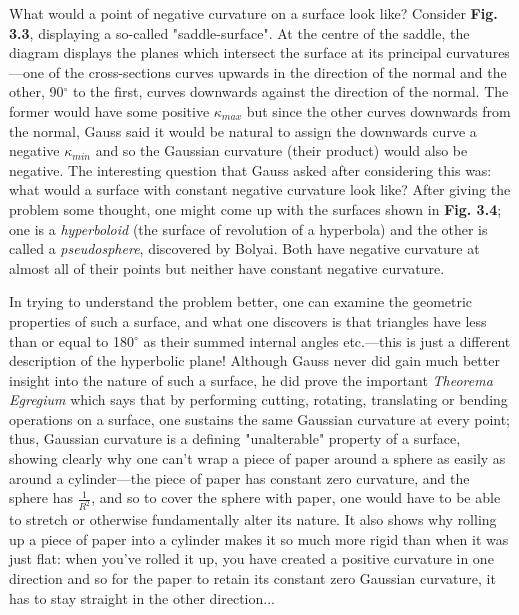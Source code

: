 \begin{multicols}{2}

What would a point of negative curvature on a surface look like? Consider \textbf{Fig. 3.3}, displaying a so-called "saddle-surface". At the centre of the saddle, the diagram displays the planes which intersect the surface at its principal curvatures---one of the cross-sections curves upwards in the direction of the normal and the other, 90\(^\circ\) to the first, curves downwards against the direction of the normal. The former would have some positive \(\kappa_{max}\) but since the other curves downwards from the normal, Gauss said it would be natural to assign the downwards curve a negative \(\kappa_{min}\) and so the Gaussian curvature (their product) would also be negative. The interesting question that Gauss asked after considering this was: what would a surface with constant negative curvature look like? After giving the problem some thought, one might come up with the surfaces shown in \textbf{Fig. 3.4}; one is a \textit{hyperboloid} (the surface of revolution of a hyperbola) and the other is called a \textit{pseudosphere}, discovered by Bolyai. Both have negative curvature at almost all of their points but neither have constant negative curvature.

In trying to understand the problem better, one can examine the geometric properties of such a surface, and what one discovers is that triangles have less than or equal to 180\(^\circ\) as their summed internal angles etc.---this is just a different description of the hyperbolic plane! Although Gauss never did gain much better insight into the nature of such a surface, he did prove the important \textit{Theorema Egregium} which says that by performing cutting, rotating, translating or bending operations on a surface, one sustains the same Gaussian curvature at every point; thus, Gaussian curvature is a defining "unalterable" property of a surface, showing clearly why one can't wrap a piece of paper around a sphere as easily as around a cylinder---the piece of paper has constant zero curvature, and the sphere has \(\frac{1}{R^2}\), and so to cover the sphere with paper, one would have to be able to stretch or otherwise fundamentally alter its nature. It also shows why rolling up a piece of paper into a cylinder makes it so much more rigid than when it was just flat: when you've rolled it up, you have created a positive curvature in one direction and so for the paper to retain its constant zero Gaussian curvature, it has to stay straight in the other direction...


\end{multicols}
